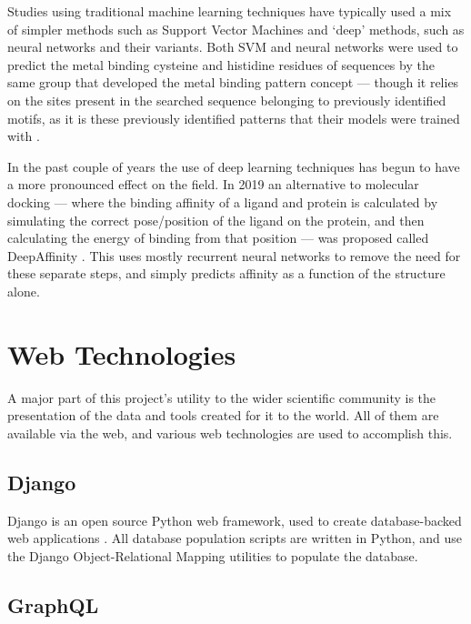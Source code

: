 Studies using traditional machine learning techniques have typically used a mix of simpler methods such as Support Vector Machines and `deep' methods, such as neural networks and their variants. Both SVM and neural networks were used to predict the metal binding cysteine and histidine residues of sequences by the same group that developed the metal binding pattern concept --- though it relies on the sites present in the searched sequence belonging to previously identified motifs, as it is these previously identified patterns that their models were trained with \cite{passerini2006identifying}.





In the past couple of years the use of deep learning techniques has begun to have a more pronounced effect on the field. In 2019 an alternative to molecular docking --- where the binding affinity of a ligand and protein is calculated by simulating the correct pose/position of the ligand on the protein, and then calculating the energy of binding from that position --- was proposed called DeepAffinity \cite{karimi2019}. This uses mostly recurrent neural networks to remove the need for these separate steps, and simply predicts affinity as a function of the structure alone.




\section{Web Technologies}

A major part of this project's utility to the wider scientific community is the presentation of the data and tools created for it to the world. All of them are available via the web, and various web technologies are used to accomplish this.


\subsection{Django}

Django is an open source Python web framework, used to create database-backed web applications \cite{django}. All database population scripts are written in Python, and use the Django Object-Relational Mapping utilities to populate the database.

\subsection{GraphQL}

